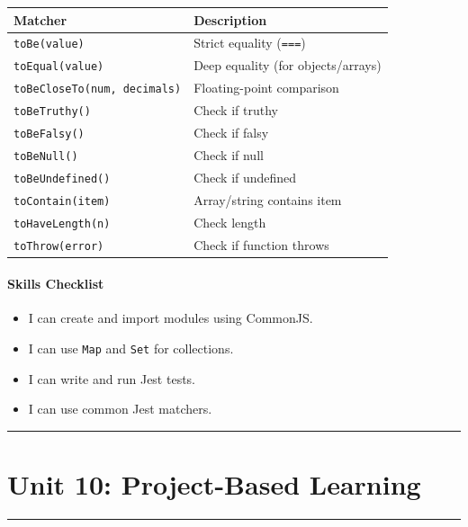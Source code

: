 \documentclass[
  justified,
  openright,
]{tufte-book}
\let\subsubsection\paragraph
\let\paragraph\paragraph
\let\subsubsection\paragraph
\let\paragraph\paragraph
\providecommand{\tightlist}{%
  \setlength{\itemsep}{0pt}\setlength{\parskip}{0pt}}
\begin{document}
{\def\LTcaptype{none} %
\begin{longtable}[]{@{}ll@{}}
\toprule\noalign{}
Matcher & Description \\
\midrule\noalign{}
\endhead
\bottomrule\noalign{}
\endlastfoot
\texttt{toBe(value)} & Strict equality (\texttt{===}) \\
\texttt{toEqual(value)} & Deep equality (for objects/arrays) \\
\texttt{toBeCloseTo(num,\ decimals)} & Floating-point comparison \\
\texttt{toBeTruthy()} & Check if truthy \\
\texttt{toBeFalsy()} & Check if falsy \\
\texttt{toBeNull()} & Check if null \\
\texttt{toBeUndefined()} & Check if undefined \\
\texttt{toContain(item)} & Array/string contains item \\
\texttt{toHaveLength(n)} & Check length \\
\texttt{toThrow(error)} & Check if function throws \\
\end{longtable}
}

\subsubsection{Skills Checklist}\label{skills-checklist-14}

\begin{itemize}
\tightlist
\item[$\square$]
  I can create and import modules using CommonJS.
\item[$\square$]
  I can use \texttt{Map} and \texttt{Set} for collections.
\item[$\square$]
  I can write and run Jest tests.
\item[$\square$]
  I can use common Jest matchers.
\end{itemize}

\begin{center}\rule{0.5\linewidth}{0.5pt}\end{center}

\section{Unit 10: Project-Based
Learning}\label{unit-10-project-based-learning}

\begin{center}\rule{0.5\linewidth}{0.5pt}\end{center}
\end{document}
